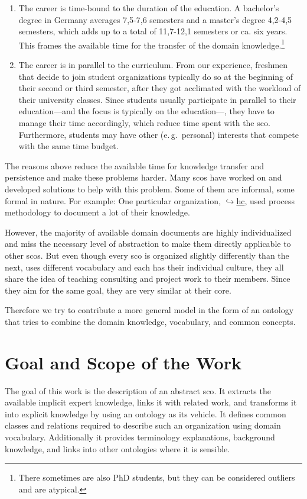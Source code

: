 \documentclass[a4paper, DIV=13, BCOR=0cm]{scrbook}
\newcommand{\eg}{e.\,g.\ }
\newcommand{\link}[2]{\href{#1}{$\hookrightarrow$#2}}
\begin{document}
\begin{enumerate}
	\item The career is time-bound to the duration of the education. A bachelor's degree in Germany averages 7,5-7,6 semesters and a master's degree 4,2-4,5 semesters, which adds up to a total of 11,7-12,1 semesters or ca. six years. \cite{stabu2019a} This frames the available time for the transfer of the domain knowledge.\footnote{There sometimes are also PhD students, but they can be considered outliers and are atypical.}
	\item The career is in parallel to the curriculum. From our experience, freshmen that decide to join student organizations typically do so at the beginning of their second or third semester, after they got acclimated with the workload of their university classes. Since students usually participate in parallel to their education---and the focus is typically on the education---, they have to manage their time accordingly, which reduce time spent with the \gls{sco}. Furthermore, students may have other (\eg personal) interests that compete with the same time budget.
\end{enumerate}

The reasons above reduce the available time for knowledge transfer and persistence and make these problems harder. Many \glspl{sco} have worked on and developed solutions to help with this problem. Some of them are informal, some formal in nature. For example: One particular organization, \link{https://hanseaticconsulting.de}{\gls{hc}}, used process methodology to document a lot of their knowledge.

However, the majority of available domain documents are highly individualized and miss the necessary level of abstraction to make them directly applicable to other \glspl{sco}. But even though every \gls{sco} is organized slightly differently than the next, uses different vocabulary and each has their individual culture, they all share the idea of teaching consulting and project work to their members. Since they aim for the same goal, they are very similar at their core. 

Therefore we try to contribute a more general model in the form of an ontology that tries to combine the domain knowledge, vocabulary, and common concepts.

\section{Goal and Scope of the Work }
The goal of this work is the description of an abstract \gls{sco}. It extracts the available implicit expert knowledge, links it with related work, and transforms it into explicit  knowledge by using an ontology as its vehicle. It defines common classes and relations required to describe such an organization using domain vocabulary. Additionally it provides terminology explanations, background knowledge, and links into other ontologies where it is sensible.
\end{document}
